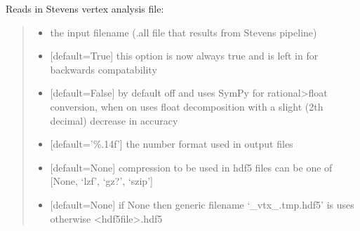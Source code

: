 \documentclass[letterpaper,12pt,english]{sphinxmanual}
\begin{document}
\begin{fulllineitems}

\pysigstartsignatures
\pysiglinewithargsret
{}
{\sphinxparamcomma {}\sphinxparamcomma {}\sphinxparamcomma {}\sphinxparamcomma {}\sphinxparamcomma {}}
{}
\pysigstopsignatures
\sphinxAtStartPar
Reads in Stevens vertex analysis file:
\begin{quote}\begin{description}
\begin{itemize}
\item {} 
\sphinxAtStartPar
{} \textendash{} the input filename (.all file that results from Stevens pipeline)

\item {} 
\sphinxAtStartPar
{} \textendash{} {[}default=True{]} this option is now always true and is left in for backwards compatability

\item {} 
\sphinxAtStartPar
{} \textendash{} {[}default=False{]} by default off and uses SymPy for rational\textendash{}\textgreater{}float conversion, when on uses float decomposition with a slight (2th decimal) decrease in accuracy

\item {} 
\sphinxAtStartPar
{} \textendash{} {[}default=’\%.14f’{]} the number format used in output files

\item {} 
\sphinxAtStartPar
{} \textendash{} {[}default=None{]} compression to be used in hdf5 files can be one of {[}None, ‘lzf’, ‘gz?’, ‘szip’{]}

\item {} 
\sphinxAtStartPar
{} \textendash{} {[}default=None{]} if None then generic filename ‘\_vtx\_.tmp.hdf5’ is uses otherwise \textless{}hdf5file\textgreater{}.hdf5

\end{itemize}

\end{description}\end{quote}

\end{fulllineitems}
\end{document}
